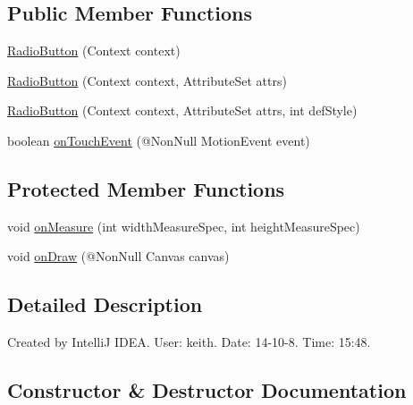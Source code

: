 \subsection*{Public Member Functions}
\begin{DoxyCompactItemize}
\item 
\hyperlink{classcom_1_1material_1_1widget_1_1_radio_button_a8932d2af5184fcb912e7a5033f27f0fb}{Radio\+Button} (Context context)
\item 
\hyperlink{classcom_1_1material_1_1widget_1_1_radio_button_abc16f05aacc9b8572e1fb2e80120525c}{Radio\+Button} (Context context, Attribute\+Set attrs)
\item 
\hyperlink{classcom_1_1material_1_1widget_1_1_radio_button_a3296e7b2233d47c238bef49892a988d8}{Radio\+Button} (Context context, Attribute\+Set attrs, int def\+Style)
\item 
boolean \hyperlink{classcom_1_1material_1_1widget_1_1_radio_button_a6e4c781510c613c673696610244c4bb5}{on\+Touch\+Event} (@Non\+Null Motion\+Event event)
\end{DoxyCompactItemize}
\subsection*{Protected Member Functions}
\begin{DoxyCompactItemize}
\item 
void \hyperlink{classcom_1_1material_1_1widget_1_1_radio_button_a8d9c9c7b1efa6404c0442cbe68cb3ac3}{on\+Measure} (int width\+Measure\+Spec, int height\+Measure\+Spec)
\item 
void \hyperlink{classcom_1_1material_1_1widget_1_1_radio_button_a10531ad3dca8ea3c5e5db80fe109aae6}{on\+Draw} (@Non\+Null Canvas canvas)
\end{DoxyCompactItemize}


\subsection{Detailed Description}
Created by IntelliJ I\+D\+EA. User\+: keith. Date\+: 14-\/10-\/8. Time\+: 15\+:48. 

\subsection{Constructor \& Destructor Documentation}
\mbox{\label{classcom_1_1material_1_1widget_1_1_radio_button_a8932d2af5184fcb912e7a5033f27f0fb}} 
